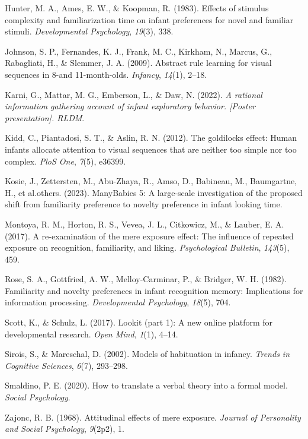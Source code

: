 \documentclass[10pt, letterpaper]{article}
\newenvironment{CSLReferences}%
  {}%
  {\par}
\begin{document}
\begin{CSLReferences}{1}{0}
\leavevmode{}%
Hunter, M. A., Ames, E. W., \& Koopman, R. (1983). Effects of stimulus
complexity and familiarization time on infant preferences for novel and
familiar stimuli. \emph{Developmental Psychology}, \emph{19}(3), 338.

\leavevmode{}%
Johnson, S. P., Fernandes, K. J., Frank, M. C., Kirkham, N., Marcus, G.,
Rabagliati, H., \& Slemmer, J. A. (2009). Abstract rule learning for
visual sequences in 8-and 11-month-olds. \emph{Infancy}, \emph{14}(1),
2--18.

\leavevmode{}%
Karni, G., Mattar, M. G., Emberson, L., \& Daw, N. (2022). \emph{A
rational information gathering account of infant exploratory behavior.
{[}Poster presentation{]}. RLDM}.

\leavevmode{}%
Kidd, C., Piantadosi, S. T., \& Aslin, R. N. (2012). The goldilocks
effect: Human infants allocate attention to visual sequences that are
neither too simple nor too complex. \emph{PloS One}, \emph{7}(5),
e36399.

\leavevmode{}%
Kosie, J., Zettersten, M., Abu-Zhaya, R., Amso, D., Babineau, M.,
Baumgartne, H., et al.others. (2023). ManyBabies 5: A large-scale
investigation of the proposed shift from familiarity preference to
novelty preference in infant looking time.

\leavevmode{}%
Montoya, R. M., Horton, R. S., Vevea, J. L., Citkowicz, M., \& Lauber,
E. A. (2017). A re-examination of the mere exposure effect: The
influence of repeated exposure on recognition, familiarity, and liking.
\emph{Psychological Bulletin}, \emph{143}(5), 459.

\leavevmode{}%
Rose, S. A., Gottfried, A. W., Melloy-Carminar, P., \& Bridger, W. H.
(1982). Familiarity and novelty preferences in infant recognition
memory: Implications for information processing. \emph{Developmental
Psychology}, \emph{18}(5), 704.

\leavevmode{}%
Scott, K., \& Schulz, L. (2017). Lookit (part 1): A new online platform
for developmental research. \emph{Open Mind}, \emph{1}(1), 4--14.

\leavevmode{}%
Sirois, S., \& Mareschal, D. (2002). Models of habituation in infancy.
\emph{Trends in Cognitive Sciences}, \emph{6}(7), 293--298.

\leavevmode{}%
Smaldino, P. E. (2020). How to translate a verbal theory into a formal
model. \emph{Social Psychology}.

\leavevmode{}%
Zajonc, R. B. (1968). Attitudinal effects of mere exposure.
\emph{Journal of Personality and Social Psychology}, \emph{9}(2p2), 1.

\end{CSLReferences}


\end{document}
